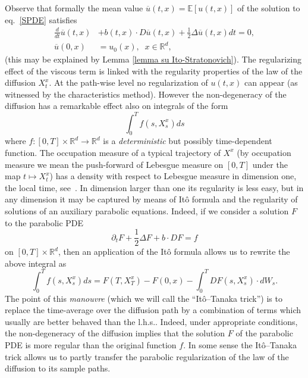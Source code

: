 \documentclass[a4paper,11pt]{article}
\begin{document}
Observe that formally the mean value $\overline{u}(t,x)=\mathbb{E}[u(t,x)]$
of the solution to eq.~\eqref{SPDE} satisfies
\begin{equation}
\begin{aligned} \frac{d}{dt}\overline{u}( t,x) &+b( t,x) \cdot D \overline
u( t,x) +\frac{1}{2}\Delta \overline u( t,x) dt =0,\\ \overline u( 0,x) &
=u_{0}( x),\;\; x \in \mathbb{R}^d, \end{aligned}  \label{mean-PDE}
\end{equation}
(this may be explained by Lemma \ref{lemma su Ito-Stratonovich}). The
regularizing effect of the viscous term is linked with the regularity
properties of the law of the diffusion $X_{t}^{x}$. At the path-wise level
no regularization of $u(t,x)$ can appear (as witnessed by the characteristics
method). However the non-degeneracy of the diffusion has a remarkable effect
also on integrals of the form
\begin{equation}
\int_{0}^{T}f(s,X_{s}^{x})ds  \label{special integrals}
\end{equation}
where $f:[0,T]\times \mathbb{R}^{d}\rightarrow \mathbb{R}^{d}$ is a \emph{%
deterministic} but possibly time-dependent function. The occupation measure
of a typical trajectory of $X^{x}$ (by occupation measure we mean the
push-forward of Lebesgue measure on $\left[ 0,T\right] $ under the map $%
t\mapsto X_{t}^{x}$) has a density with respect to Lebesgue measure in
dimension one, the local time, see~\cite{RY}. In dimension larger than one
its regularity is less easy, but in any dimension it may be captured by
means of It\^{o} formula and the regularity of solutions of an auxiliary
parabolic equations. Indeed, if we consider a solution $F$ to the parabolic
PDE
\begin{equation*}
\partial _{t}F+\frac{1}{2}\Delta F+b\cdot DF=f
\end{equation*}
on $[0,T]\times \mathbb{R}^{d}$, then an application of the It\^{o} formula
allows us to rewrite the above integral as
\begin{equation*}
\int_{0}^{T}f(s,X_{s}^{x})ds=F(T,X_{T}^{x})-F(0,x)-%
\int_{0}^{T}DF(s,X_{s}^{x})\cdot dW_{s}.
\end{equation*}
The point of this \emph{manouvre} (which we will call the ``It\^{o}--Tanaka
trick'') is to replace the time-average over the diffusion path by a
combination of terms which usually are better behaved than the l.h.s..
Indeed, under appropriate conditions, the non-degeneracy of the diffusion
implies that the solution $F$ of the parabolic PDE is more regular than the
original function $f$. In some sense the It\^{o}--Tanaka trick allows us to
partly transfer the parabolic regularization of the law of the diffusion to
its sample paths.
\end{document}
